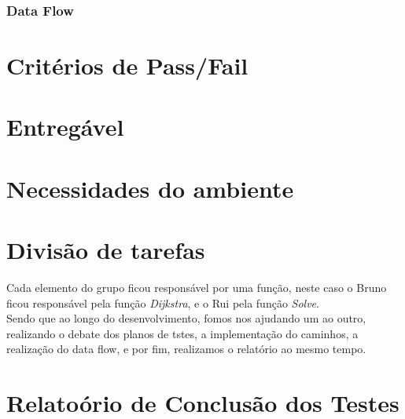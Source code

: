 \documentclass{article}
\begin{document}
\subsubsection{Data Flow}


\section{Critérios de Pass/Fail}

\section{Entregável}

\section{Necessidades do ambiente}



\section{Divisão de tarefas}

\quad Cada elemento do grupo ficou responsável por uma função, neste caso o Bruno ficou responsável pela função \textit{Dijkstra}, e o Rui pela função \textit{Solve}.\\

Sendo que ao longo do desenvolvimento, fomos nos ajudando um ao outro, realizando o debate dos planos de tstes, a implementação do caminhos, a realização do data flow, e por fim, realizamos o relatório ao mesmo tempo. 

\section{Relatoório de Conclusão dos Testes}
\end{document}
